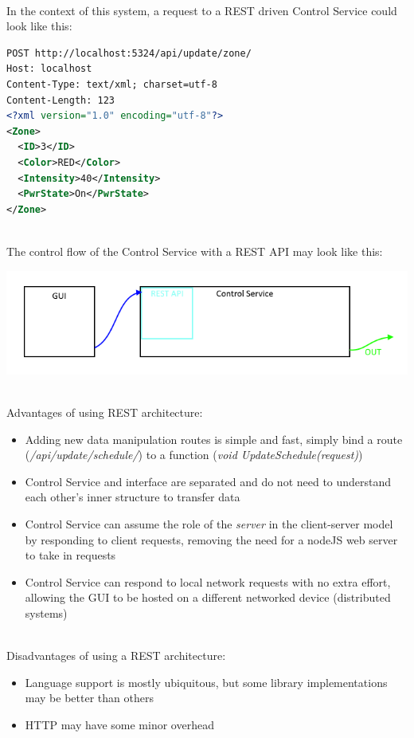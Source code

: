 \documentclass[onecolumn, draftclsnofoot,10pt, compsoc]{IEEEtran}
\begin{document}
		\noindent \\In the context of this system, a request to a REST driven Control Service could look like this:
		\begin{lstlisting}[language=XML]
POST http://localhost:5324/api/update/zone/
Host: localhost
Content-Type: text/xml; charset=utf-8
Content-Length: 123
<?xml version="1.0" encoding="utf-8"?>
<Zone>
  <ID>3</ID>
  <Color>RED</Color>
  <Intensity>40</Intensity>
  <PwrState>On</PwrState>
</Zone>
		\end{lstlisting}


		\noindent \\The control flow of the Control Service with a REST API may look like this:

		\includegraphics[width=\linewidth]{RESTDiag.png}

		\noindent \\Advantages of using REST architecture:
		\begin{itemize}
			\item Adding new data manipulation routes is simple and fast, simply bind a route (\textit{/api/update/schedule/}) to a function (\textit{void UpdateSchedule(request)})
			\item Control Service and interface are separated and do not need to understand each other's inner structure to transfer data
			\item Control Service can assume the role of the \textit{server} in the client-server model by responding to client requests, removing the need for a nodeJS web server to take in requests
			\item Control Service can respond to local network requests with no extra effort, allowing the GUI to be hosted on a different networked device (distributed systems)
		\end{itemize}

		\noindent \\Disadvantages of using a REST architecture:
		\begin{itemize}
			\item Language support is mostly ubiquitous, but some library implementations may be better than others
			\item HTTP may have some minor overhead
		\end{itemize}
\end{document}
